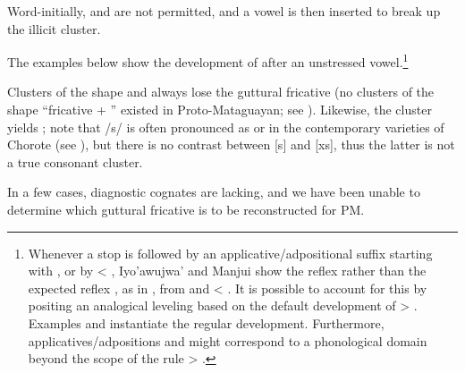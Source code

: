 Word-initially,  and  are not permitted, and a vowel is then inserted to break up the illicit cluster.

\begin{exe}
    \ex \cactus
    \ex \up
\end{exe}

The examples below show the development of  after an unstressed vowel.\footnote{Whenever a stop is followed by an applicative/adpositional suffix starting with , or by  < , Iyo'awujwa' and Manjui show the reflex  rather than the expected reflex , as in , from  and  < . It is possible to account for this by positing an analogical leveling based on the default development of  > . Examples  and  instantiate the regular development. Furthermore, applicatives/adpositions and  might correspond to a phonological domain beyond the scope of the rule  > .}

\begin{exe}
    \ex \thorncutjan
    \ex \beard \label{ch-px-p-beard}
    \ex \uncle \label{ch-tx-t-uncle}
    \ex \knee
\end{exe}

Clusters of the shape  and  always lose the guttural fricative (no clusters of the shape ``fricative + '' existed in Proto-Mataguayan; see ). Likewise, the cluster  yields ; note that /s/ is often pronounced as  or  in the contemporary varieties of Chorote (see ), but there is no contrast between [s] and [xs], thus the latter is not a true consonant cluster.

\begin{exe}
    \ex \centipedepl
    \ex \killbird
    \ex \finger
    \ex \redquebracho
    \ex \oldpl
    \ex \healthy
    \ex \eggits
    \ex \headits
    \ex \caracarapl
    \ex \teach
    \ex \meat
\end{exe}

In a few cases, diagnostic cognates are lacking, and we have been unable to determine which guttural fricative is to be reconstructed for PM.

